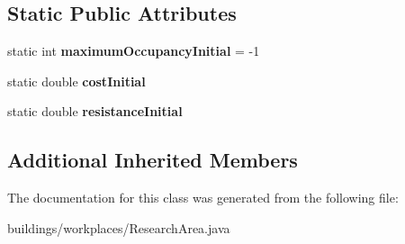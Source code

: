 \subsection*{Static Public Attributes}
\begin{DoxyCompactItemize}
\item 
static int {\bfseries maximum\+Occupancy\+Initial} = -\/1\hypertarget{classbuildings_1_1workplaces_1_1_research_area_a1258830476216fd5c0a50913f953c199}{}\label{classbuildings_1_1workplaces_1_1_research_area_a1258830476216fd5c0a50913f953c199}

\item 
static double {\bfseries cost\+Initial}\hypertarget{classbuildings_1_1workplaces_1_1_research_area_a398b1b9102f920d3bdd7de48813f01db}{}\label{classbuildings_1_1workplaces_1_1_research_area_a398b1b9102f920d3bdd7de48813f01db}

\item 
static double {\bfseries resistance\+Initial}\hypertarget{classbuildings_1_1workplaces_1_1_research_area_a16c8098d756d3a148cbfaa72d8659ac0}{}\label{classbuildings_1_1workplaces_1_1_research_area_a16c8098d756d3a148cbfaa72d8659ac0}

\end{DoxyCompactItemize}
\subsection*{Additional Inherited Members}


The documentation for this class was generated from the following file\+:\begin{DoxyCompactItemize}
\item 
buildings/workplaces/Research\+Area.\+java\end{DoxyCompactItemize}
